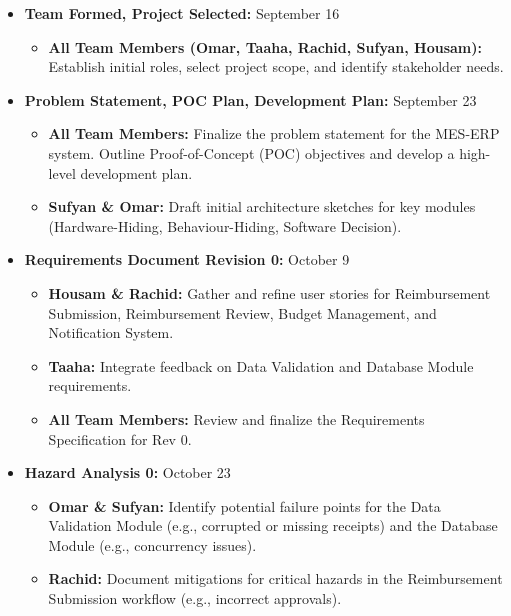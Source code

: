 \documentclass[12pt, titlepage]{article}
\begin{document}
\begin{itemize}
  \item \textbf{Team Formed, Project Selected:} September 16 
  \begin{itemize}
    \item \textbf{All Team Members (Omar, Taaha, Rachid, Sufyan, Housam):} 
    Establish initial roles, select project scope, and identify stakeholder needs.
  \end{itemize}
  
  \item \textbf{Problem Statement, POC Plan, Development Plan:} September 23 
  \begin{itemize}
    \item \textbf{All Team Members:} 
    Finalize the problem statement for the MES-ERP system. Outline Proof-of-Concept (POC) objectives and develop a high-level development plan. 
    \item \textbf{Sufyan \& Omar:} Draft initial architecture sketches for key modules (Hardware-Hiding, Behaviour-Hiding, Software Decision).
  \end{itemize}
  
  \item \textbf{Requirements Document Revision 0:} October 9 
  \begin{itemize}
    \item \textbf{Housam \& Rachid:} Gather and refine user stories for Reimbursement Submission, Reimbursement Review, Budget Management, and Notification System.
    \item \textbf{Taaha:} Integrate feedback on Data Validation and Database Module requirements.
    \item \textbf{All Team Members:} Review and finalize the Requirements Specification for Rev 0.
  \end{itemize}
  
  \item \textbf{Hazard Analysis 0:} October 23 
  \begin{itemize}
    \item \textbf{Omar \& Sufyan:} Identify potential failure points for the Data Validation Module (e.g., corrupted or missing receipts) and the Database Module (e.g., concurrency issues).
    \item \textbf{Rachid:} Document mitigations for critical hazards in the Reimbursement Submission workflow (e.g., incorrect approvals).
  \end{itemize}
  

\end{itemize}
\end{document}
